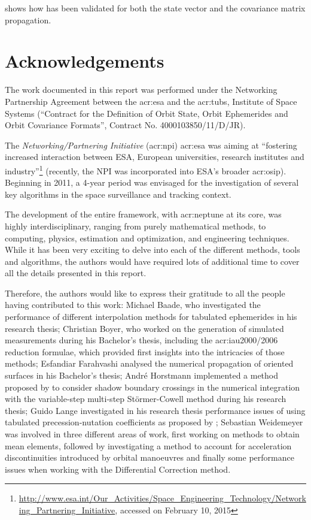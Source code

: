  shows how \neptune has been validated for both the state vector and the covariance matrix propagation.

\section{Acknowledgements}

The work documented in this report was performed under the Networking Partnership Agreement between the \gls{acr:esa} and the \gls{acr:tubs}, Institute of Space Systems (``Contract for the Definition of Orbit State, Orbit Ephemerides and Orbit Covariance
Formats'', Contract No. 4000103850/11/D/JR).

The \textit{Networking/Partnering Initiative} (\acrshort{acr:npi}) \acrshort{acr:esa} was aiming at ``fostering increased interaction between ESA, European universities,
research institutes and industry''\footnote{\url{http://www.esa.int/Our_Activities/Space_Engineering_Technology/Networking_Partnering_Initiative}, accessed on February
10, 2015} (recently, the NPI was incorporated into ESA's broader \gls{acr:osip}). Beginning in \num{2011}, a 4-year period was envisaged for the investigation of several key algorithms in the space surveillance and tracking context.

The development of the entire framework, with \gls{acr:neptune} at its core, was highly interdisciplinary, ranging from purely mathematical methods, to computing, physics, estimation and optimization, and engineering
techniques. While it has been very exciting to delve into each of the different methods, tools and algorithms, the authors would have required lots of additional time to cover all the details presented in this report. 

Therefore, the authors would like to express their gratitude to all the people having contributed to this work: Michael Baade, who
investigated the performance of different interpolation methods for tabulated ephemerides in his research thesis; Christian Boyer, who worked on the generation of simulated measurements
during his Bachelor's thesis, including the \acrshort{acr:iau}2000/2006 reduction formulae, which provided first insights into the intricacies of those methods; Esfandiar
Farahvashi analysed the numerical propagation of oriented surfaces in his Bachelor's thesis; Andr\'e Horstmann implemented a method proposed by \citet{lundberg1991} to consider
shadow boundary crossings in the numerical integration with the variable-step multi-step St\"ormer-Cowell method during his research thesis; Guido Lange investigated in
his research thesis performance issues of using tabulated precession-nutation coefficients as proposed by \citet{coppola2009}; Sebastian Weidemeyer was involved in three different
areas of work, first working on methods to obtain mean elements, followed by investigating a method to account for acceleration discontinuities introduced by orbital manoeuvres
and finally some performance issues when working with the Differential Correction method.

